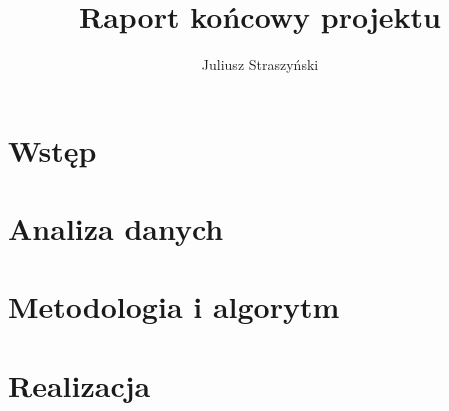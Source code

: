 \documentclass[12pt, a4paper]{article}
\begin{document}
    \author{Juliusz Straszyński}
    \title{Raport końcowy projektu}
    \maketitle
    \tableofcontents


    \section{Wstęp}\label{sec:wstep}
    

    \section{Analiza danych}\label{sec:analiza-danych}
    

    \section{Metodologia i algorytm}\label{sec:metodologia-i-algorytm}
    

    \section{Realizacja}
    
\end{document}
